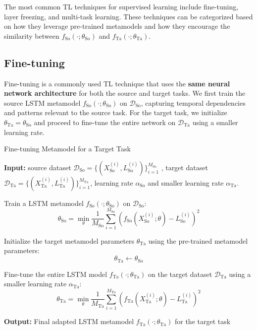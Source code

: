 The most common TL techniques for supervised learning include fine-tuning, layer freezing, and multi-task learning. 
These techniques can be categorized based on how they leverage pre-trained metamodels and how they encourage the similarity between $f_{\text{So}}(\cdot ; \theta_{\text{So}})$ and $f_{\text{Ta}}(\cdot ; \theta_{\text{Ta}})$.

\subsection{Fine-tuning}

Fine-tuning is a commonly used TL technique that uses the \textbf{same neural network architecture} for both the source and target tasks.
We first train the source LSTM metamodel $f_{\text{So}}(\cdot; \theta_{\text{So}})$ on $\mathcal{D}_{\text{So}}$, capturing temporal dependencies and patterns relevant to the source task. 
For the target task, we initialize $\theta_{\text{Ta}} = \theta_{\text{So}}$ and proceed to fine-tune the entire network on $\mathcal{D}_{\text{Ta}}$ using a smaller learning rate. 

\begin{algorithm}[ht!]
\caption{Fine-tuning Metamodel for a Target Task}
\begin{algorithmic}[1] \label{alg3:fineTuning}
    \STATE \textbf{Input:} source dataset $\mathcal{D}_{\text{So}} = \{(X_{\text{So}}^{(i)}, L_{\text{So}}^{(i)})\}_{i=1}^{M_{\text{So}}}$ , target dataset $\mathcal{D}_{\text{Ta}} = \{(X_{\text{Ta}}^{(i)}, L_{\text{Ta}}^{(i)})\}_{i=1}^{M_{\text{Ta}}}$, learning rate $\alpha_{\text{So}}$ and smaller learning rate $\alpha_{\text{Ta}}$.
    
    \STATE Train a LSTM metamodel $f_{\text{So}}(\cdot; \theta_{\text{So}})$ on $\mathcal{D}_{\text{So}}$:
    \begin{equation}
        \theta_{\text{So}} = \min_{\theta} \frac{1}{M_{\text{So}}} \sum_{i=1}^{M_{\text{So}}} \left( f_{\text{So}}(X_{\text{So}}^{(i)}; \theta) - L_{\text{So}}^{(i)} \right)^2
    \end{equation}

    \STATE Initialize the target metamodel parameters $\theta_{\text{Ta}}$ using the pre-trained metamodel parameters:
    \[
    \theta_{\text{Ta}} \gets \theta_{\text{So}}
    \]
    
    \STATE Fine-tune the entire LSTM model $f_{\text{Ta}}(\cdot; \theta_{\text{Ta}})$ on the target dataset $\mathcal{D}_{\text{Ta}}$ using a smaller learning rate $\alpha_{\text{Ta}}$:
    \begin{equation}
        \theta_{\text{Ta}} = \min_{\theta} \frac{1}{M_{\text{Ta}}} \sum_{i=1}^{M_{\text{Ta}}} \left( f_{\text{Ta}}(X_{\text{Ta}}^{(i)}; \theta) - L_{\text{Ta}}^{(i)} \right)^2
    \end{equation}
    
    \STATE \textbf{Output:} Final adapted LSTM metamodel $f_{\text{Ta}}(\cdot; \theta_{\text{Ta}})$ for the target task
\end{algorithmic}
\end{algorithm}

